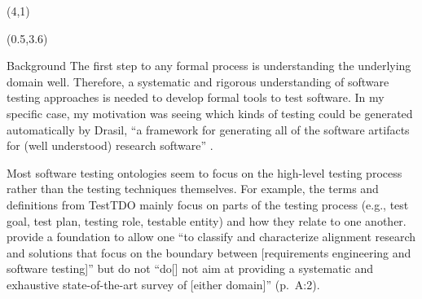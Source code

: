 \documentclass[22pt]{beamer}
\begin{document}
\begin{frame}[fragile]
    \begin{textblock}{8}(4,1)
        \titlepage
    \end{textblock}

    \begin{textblock}{7.25}(0.5,3.6)

        \begin{block}{\fontsize{37}{20}\selectfont Background}
            The first step to any formal process is understanding the underlying
            domain well. Therefore, a systematic and rigorous understanding of
            software testing approaches is needed to develop formal tools to test
            software. In my specific case, my motivation was seeing which kinds
            of testing could be generated automatically by Drasil, ``a framework
            for generating all of the software artifacts for (well understood)
            research software'' \citep{carette_drasil_2021}.

            \quad %

            Most software testing ontologies seem to focus on the high-level
            testing process rather than the testing techniques themselves. For
            example, the terms and definitions \citep{TebesEtAl2020b} from
            TestTDO \citep{TebesEtAl2020a} mainly focus on parts of the testing
            process (e.g., test goal, test plan, testing role, testable entity)
            and how they relate to one another.
            \citet{UnterkalmsteinerEtAl2014} provide a foundation to allow one
            ``to classify and characterize alignment research and solutions
            that focus on the boundary between [requirements engineering and
                    software testing]'' but do not ``do[] not aim at providing a
            systematic and exhaustive state-of-the-art survey of [either domain]''
            (p.~A:2).
            \vspace{5mm}
        \end{block}


\end{textblock}
\end{frame}
\end{document}
